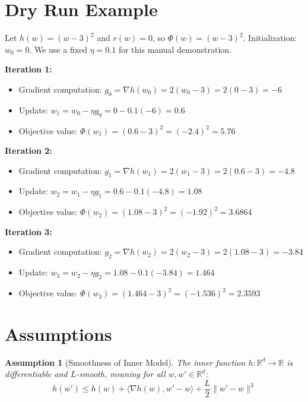 \documentclass{article}
\newtheorem{assumption}{Assumption}
\begin{document}
\section*{Dry Run Example}
Let $h(w) = (w-3)^2$ and $r(w) = 0$, so $\Phi(w) = (w-3)^2$. Initialization: $w_0 = 0$. We use a fixed $\eta = 0.1$ for this manual demonstration.

\textbf{Iteration 1:}
\begin{itemize}
    \item Gradient computation: $g_0 = \nabla h(w_0) = 2(w_0 - 3) = 2(0 - 3) = -6$
    \item Update: $w_1 = w_0 - \eta g_0 = 0 - 0.1(-6) = 0.6$
    \item Objective value: $\Phi(w_1) = (0.6 - 3)^2 = (-2.4)^2 = 5.76$
\end{itemize}

\textbf{Iteration 2:}
\begin{itemize}
    \item Gradient computation: $g_1 = \nabla h(w_1) = 2(w_1 - 3) = 2(0.6 - 3) = -4.8$
    \item Update: $w_2 = w_1 - \eta g_1 = 0.6 - 0.1(-4.8) = 1.08$
    \item Objective value: $\Phi(w_2) = (1.08 - 3)^2 = (-1.92)^2 = 3.6864$
\end{itemize}

\textbf{Iteration 3:}
\begin{itemize}
    \item Gradient computation: $g_2 = \nabla h(w_2) = 2(w_2 - 3) = 2(1.08 - 3) = -3.84$
    \item Update: $w_3 = w_2 - \eta g_2 = 1.08 - 0.1(-3.84) = 1.464$
    \item Objective value: $\Phi(w_3) = (1.464 - 3)^2 = (-1.536)^2 = 2.3593$
\end{itemize}

\section*{Assumptions}
\begin{assumption}[Smoothness of Inner Model]
The inner function $h: \mathbb{R}^d \to \mathbb{R}$ is differentiable and $L$-smooth, meaning for all $w, w' \in \mathbb{R}^d$:
\begin{equation}
    h(w') \leq h(w) + \langle \nabla h(w), w' - w \rangle + \frac{L}{2} \|w' - w\|^2
\end{equation}
\end{assumption}
\end{document}
